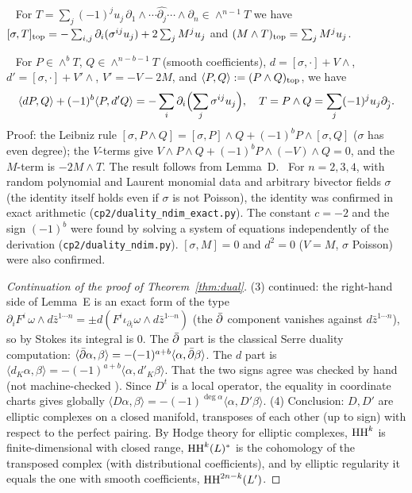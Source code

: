 \begin{lem}\tP\ \tV\label{lem:D}
For $T=\sum_j(-1)^ju_j\,\partial_1\wedge\cdots\widehat{\partial_j}\cdots\wedge\partial_n\in\wedge^{n-1}T$ we have $[\sigma,T]_{\rm top}=-\sum_{i,j}\partial_i(\sigma^{ij}u_j)+2\sum_jM^ju_j$ and $(M\wedge T)_{\rm top}=\sum_jM^ju_j$.
\end{lem}
\begin{lem}\tP\ \tV\label{lem:E}
For $P\in\wedge^bT$, $Q\in\wedge^{n-b-1}T$ (smooth coefficients), $d=[\sigma,\cdot]+V\wedge$, $d'=[\sigma,\cdot]+V'\wedge$, $V'=-V-2M$, and $\langle P,Q\rangle:=(P\wedge Q)_{\rm top}$, we have
\[\langle dP,Q\rangle+(-1)^b\langle P,d'Q\rangle=-\sum_i\partial_i\Bigl(\sum_j\sigma^{ij}u_j\Bigr),\quad T=P\wedge Q=\sum_j(-1)^ju_j\partial_{\hat j}.\]
Proof: the Leibniz rule $[\sigma,P\wedge Q]=[\sigma,P]\wedge Q+(-1)^bP\wedge[\sigma,Q]$ ($\sigma$ has even degree); the $V$-terms give $V\wedge P\wedge Q+(-1)^bP\wedge(-V)\wedge Q=0$, and the $M$-term is $-2M\wedge T$. The result follows from Lemma~D.
\tV\ For $n=2,3,4$, with random polynomial and Laurent monomial data and arbitrary bivector fields $\sigma$ (the identity itself holds even if $\sigma$ is not Poisson), the identity was confirmed in exact arithmetic (\texttt{cp2/duality\_ndim\_exact.py}). The constant $c=-2$ and the sign $(-1)^b$ were found by solving a system of equations independently of the derivation (\texttt{cp2/duality\_ndim.py}). $[\sigma,M]=0$ and $d^2=0$ ($V=M$, $\sigma$ Poisson) were also confirmed.
\end{lem}
\begin{proof}[Continuation of the proof of Theorem~\ref{thm:dual}]
(3) continued: the right-hand side of Lemma~E is an exact form of the type $\partial_iF^i\,\omega\wedge d\bar z^{1\cdots n}=\pm d(F^i\iota_{\partial_i}\omega\wedge d\bar z^{1\cdots n})$ (the $\bar\partial$ component vanishes against $d\bar z^{1\cdots n}$), so by Stokes its integral is $0$. The $\bar\partial$ part is the classical Serre duality computation: $\langle\bar\partial\alpha,\beta\rangle=-(-1)^{a+b}\langle\alpha,\bar\partial\beta\rangle$. The $d$ part is $\langle d_K\alpha,\beta\rangle=-(-1)^{a+b}\langle\alpha,d'_K\beta\rangle$. That the two signs agree was checked by hand (not machine-checked \tQ). Since $D^t$ is a local operator, the equality in coordinate charts gives globally $\langle D\alpha,\beta\rangle=-(-1)^{\deg\alpha}\langle\alpha,D'\beta\rangle$.
(4) Conclusion: $D,D'$ are elliptic complexes on a closed manifold, transposes of each other (up to sign) with respect to the perfect pairing. By Hodge theory for elliptic complexes, $\mathrm{HH}^k$ is finite-dimensional with closed range, $\mathrm{HH}^k(L)^*$ is the cohomology of the transposed complex (with distributional coefficients), and by elliptic regularity it equals the one with smooth coefficients, $\mathrm{HH}^{2n-k}(L')$.\qedhere
\end{proof}
